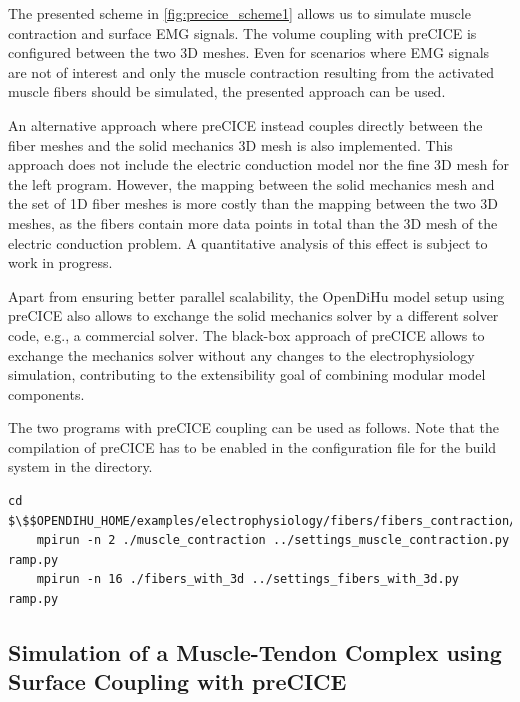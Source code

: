 The presented scheme in \cref{fig:precice_scheme1} allows us to simulate muscle contraction and surface EMG signals. The volume coupling with preCICE is configured between the two 3D meshes. Even for scenarios where EMG signals are not of interest and only the muscle contraction resulting from the activated muscle fibers should be simulated, the presented approach can be used.

An alternative approach where preCICE instead couples directly between the fiber meshes and the solid mechanics 3D mesh is also implemented. This approach does not include the electric conduction model nor the fine 3D mesh for the left program.
However, the mapping between the solid mechanics mesh and the set of 1D fiber meshes is more costly than the mapping between the two 3D meshes, as the fibers contain more data points in total than the 3D mesh of the electric conduction problem. A quantitative analysis of this effect is subject to work in progress.

Apart from ensuring better parallel scalability, the OpenDiHu model setup using preCICE also allows to exchange the solid mechanics solver by a different solver code, e.g., a commercial solver. The black-box approach of preCICE allows to exchange the mechanics solver without any changes to the electrophysiology simulation, contributing to the extensibility goal of combining modular model components.

\begin{reproduce_no_break}
  The two programs with preCICE coupling can be used as follows. Note that the compilation of preCICE has to be enabled in the  configuration file for the  build system in the  directory.
  \begin{lstlisting}[columns=fullflexible,breaklines=true,postbreak=\mbox{\textcolor{gray}{$\hookrightarrow$}\space}]
    cd $\$$OPENDIHU_HOME/examples/electrophysiology/fibers/fibers_contraction/with_precice_volume_coupling/build_release
    mpirun -n 2 ./muscle_contraction ../settings_muscle_contraction.py ramp.py
    mpirun -n 16 ./fibers_with_3d ../settings_fibers_with_3d.py ramp.py
  \end{lstlisting}
\end{reproduce_no_break}

\subsection{Simulation of a Muscle-Tendon Complex using Surface Coupling with preCICE}\label{sec:surface_coupling_contraction}

